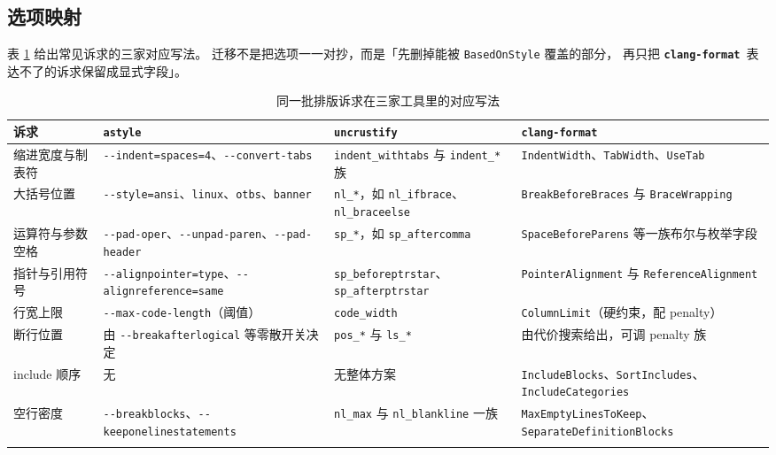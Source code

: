 \documentclass[12pt,a4paper,fontset=fandol]{ctexbook}
\newcommand{\Opt}[1]{\texttt{-\/-#1}}
\newcommand{\Lib}[1]{\textbf{\texttt{#1}}}
\newcommand{\Fmt}{\Lib{clang-format}}
\begin{document}
\subsection{选项映射}\label{sec:ch11-s6-map}

表 \ref{tab:ch11-map} 给出常见诉求的三家对应写法。
迁移不是把选项一一对抄，而是「先删掉能被 \texttt{BasedOnStyle} 覆盖的部分，
再只把 \Fmt\ 表达不了的诉求保留成显式字段」。

{\footnotesize
\begin{longtable}{%
  >{\raggedright\arraybackslash}p{}%
  >{\raggedright\arraybackslash}p{}%
  >{\raggedright\arraybackslash}p{}%
  >{\raggedright\arraybackslash}p{}%
  }
  \toprule
  诉求 & \Lib{astyle} & \Lib{uncrustify} & \Lib{clang-format} \\
  \midrule
  \endhead
  缩进宽度与制表符 & \Opt{indent=\-spaces=4}、\Opt{convert-tabs} &
    \texttt{indent\_with\-tabs} 与 \texttt{indent\_*} 族 &
    \texttt{IndentWidth}、\texttt{TabWidth}、\texttt{UseTab} \\
  大括号位置 & \Opt{style=ansi}、\texttt{linux}、\texttt{otbs}、\texttt{banner} &
    \texttt{nl\_*}，如 \texttt{nl\_if\-brace}、\texttt{nl\_brace\-else} &
    \texttt{BreakBefore\-Braces} 与 \texttt{BraceWrapping} \\
  运算符与参数空格 & \Opt{pad-oper}、\Opt{unpad-paren}、\Opt{pad-header} &
    \texttt{sp\_*}，如 \texttt{sp\_after\-comma} &
    \texttt{SpaceBeforeParens} 等一族布尔与枚举字段 \\
  指针与引用符号 & \Opt{align\-pointer=type}、\Opt{align\-reference=same} &
    \texttt{sp\_before\-ptr\-star}、\texttt{sp\_after\-ptr\-star} &
    \texttt{PointerAlignment} 与 \texttt{ReferenceAlignment} \\
  行宽上限 & \Opt{max-code-length}（阈值） & \texttt{code\_width} &
    \texttt{ColumnLimit}（硬约束，配 penalty） \\
  断行位置 & 由 \Opt{break\-after\-logical} 等零散开关决定 &
    \texttt{pos\_*} 与 \texttt{ls\_*} & 由代价搜索给出，可调 penalty 族 \\
  include 顺序 & 无 & 无整体方案 &
    \texttt{IncludeBlocks}、\texttt{SortIncludes}、\texttt{Include\-Categories} \\
  空行密度 & \Opt{break\-blocks}、\Opt{keep\-one\-line\-statements} &
    \texttt{nl\_max} 与 \texttt{nl\_blank\-line} 一族 &
    \texttt{MaxEmptyLines\-To\-Keep}、\texttt{Separate\-Definition\-Blocks} \\
  \bottomrule
  \caption{同一批排版诉求在三家工具里的对应写法}
  \label{tab:ch11-map}
\end{longtable}
}
\end{document}
